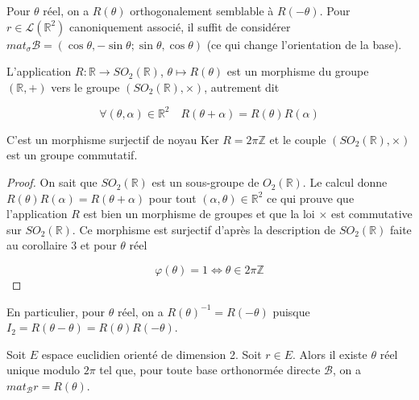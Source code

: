 \begin{remark}

Pour $\theta$ réel, on a $R(\theta)$ orthogonalement semblable à $R(-\theta)$. Pour $r \in \mathcal{L}(\mathbb{R}^2)$ canoniquement associé, il suffit de considérer $mat_{\sigma} \mathcal{B} = (\cos \theta, -\sin \theta; \sin \theta, \cos \theta)$ (ce qui change l'orientation de la base).

\end{remark}

\begin{theorem}
\label{thm:7}

L'application $R : \mathbb{R} \rightarrow SO_2(\mathbb{R})$, $\theta \mapsto R(\theta)$ est un morphisme du groupe $(\mathbb{R}, +)$ vers le groupe $(SO_2(\mathbb{R}), \times)$, autrement dit

\[
\forall (\theta, \alpha) \in \mathbb{R}^2 \quad R(\theta + \alpha) = R(\theta)R(\alpha)
\]

C'est un morphisme surjectif de noyau Ker $R = 2\pi \mathbb{Z}$ et le couple $(SO_2(\mathbb{R}), \times)$ est un groupe commutatif.

\end{theorem}

\begin{proof}

On sait que $SO_2(\mathbb{R})$ est un sous-groupe de $O_2(\mathbb{R})$. Le calcul donne $R(\theta)R(\alpha) = R(\theta + \alpha)$ pour tout $(\alpha, \theta) \in \mathbb{R}^2$ ce qui prouve que l'application $R$ est bien un morphisme de groupes et que la loi $\times$ est commutative sur $SO_2(\mathbb{R})$. Ce morphisme est surjectif d'après la description de $SO_2(\mathbb{R})$ faite au corollaire 3 et pour $\theta$ réel

\[
\varphi(\theta) = 1 \Leftrightarrow \theta \in 2\pi \mathbb{Z}
\]

\end{proof}

\begin{remark}

En particulier, pour $\theta$ réel, on a $R(\theta)^{-1} = R(-\theta)$ puisque $I_2 = R(\theta - \theta) = R(\theta)R(-\theta)$.

\end{remark}

\begin{corollary}
\label{cor:4}

Soit $E$ espace euclidien orienté de dimension 2. Soit $r \in E$. Alors il existe $\theta$ réel unique modulo $2\pi$ tel que, pour toute base orthonormée directe $\mathcal{B}$, on a $mat_{\mathcal{B}} r = R(\theta)$.

\end{corollary}

